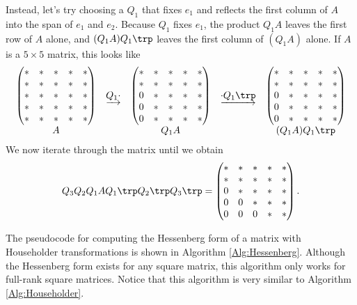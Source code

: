 Instead, let's try choosing a $Q_1$ that fixes $e_1$ and reflects the first column of $A$ into the span of $e_1$ and $e_2$.
Because $Q_1$ fixes $e_1$, the product $Q_1A$ leaves the first row of $A$ alone, and $(Q_1A)Q_1\trp$ leaves the first column of $(Q_1A)$ alone.
If $A$ is a $5 \times 5$ matrix, this looks like
\[
\begin{array}{ccccc}
\begin{pmatrix}
* & * & * & * & * \\
* & * & * & * & * \\
* & * & * & * & * \\
* & * & * & * & * \\
* & * & * & * & *
\end{pmatrix}
&\underrightarrow{Q_1 \cdot }&
\begin{pmatrix}
* & * & * & * & * \\
* & * & * & * & * \\
0 & * & * & * & * \\
0 & * & * & * & * \\
0 & * & * & * & *
\end{pmatrix}
&\underrightarrow{\cdot Q_1\trp }&
\begin{pmatrix}
* & * & * & * & * \\
* & * & * & * & * \\
0 & * & * & * & * \\
0 & * & * & * & * \\
0 & * & * & * & *
\end{pmatrix}
\\
A & & Q_1A & & (Q_1 A) Q_1\trp
  \end{array}
\]
We now iterate through the matrix until we obtain
\begin{equation*}
Q_3 Q_2 Q_1 A Q_1\trp Q_2 \trp Q_3\trp =
\begin{pmatrix}
* & * & * & * & * \\
* & * & * & * & * \\
0 & * & * & * & * \\
0 & 0 & * & * & * \\
0 & 0 & 0 & * & *
\end{pmatrix}.
\end{equation*}

The pseudocode for computing the Hessenberg form of a matrix with Householder transformations is shown in Algorithm \ref{Alg:Hessenberg}.
Although the Hessenberg form exists for any square matrix, this algorithm only works for full-rank square matrices.
Notice that this algorithm is very similar to Algorithm \ref{Alg:Householder}.

